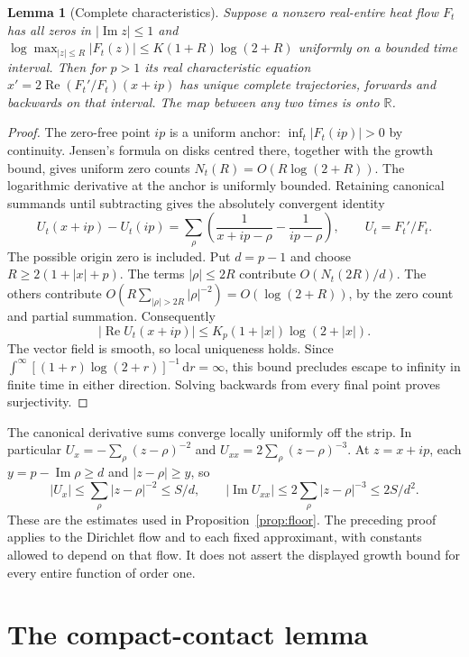 \documentclass[11pt]{article}
\newtheorem{lemma}[theorem]{Lemma}
\theoremstyle{remark}\newtheorem{remark}[theorem]{Remark}
\newcommand{\Rea}{\operatorname{Re}}
\newcommand{\Ima}{\operatorname{Im}}
\newcommand{\dd}{\mathrm{d}}
\begin{document}
\begin{lemma}[Complete characteristics]\label{lem:complete}
Suppose a nonzero real-entire heat flow $F_t$ has all zeros in
$|\Ima z|\le1$ and
$\log\max_{|z|\le R}|F_t(z)|\le K(1+R)\log(2+R)$ uniformly on a
bounded time interval. Then for $p>1$ its real characteristic equation
$x'=2\Rea(F_t'/F_t)(x+ip)$ has unique complete trajectories, forwards
and backwards on that interval. The map between any two times is onto
$\mathbb R$.
\end{lemma}
\begin{proof}
The zero-free point $ip$ is a uniform anchor:
$\inf_t|F_t(ip)|>0$ by continuity. Jensen's formula on disks centred
there, together with the growth bound, gives uniform zero counts
$N_t(R)=O(R\log(2+R))$. The logarithmic derivative at the anchor is
uniformly bounded. Retaining canonical summands until subtracting gives
the absolutely convergent identity
\[
 U_t(x+ip)-U_t(ip)=\sum_\rho
 \left(\frac1{x+ip-\rho}-\frac1{ip-\rho}\right),
 \qquad U_t=F_t'/F_t.
\]
The possible origin zero is included. Put $d=p-1$ and choose
$R\ge2(1+|x|+p)$. The terms $|\rho|\le2R$ contribute
$O(N_t(2R)/d)$. The others contribute
$O(R\sum_{|\rho|>2R}|\rho|^{-2})=O(\log(2+R))$, by the zero count
and partial summation. Consequently
\[
 |\Rea U_t(x+ip)|\le K_p(1+|x|)\log(2+|x|).
\]
The vector field is smooth, so local uniqueness holds. Since
$\int^\infty [(1+r)\log(2+r)]^{-1}\,\dd r=\infty$, this bound
precludes escape to infinity in finite time in either direction.
Solving backwards from every final point proves surjectivity.
\end{proof}

The canonical derivative sums converge locally uniformly off the strip.
In particular $U_x=-\sum_\rho(z-\rho)^{-2}$ and
$U_{xx}=2\sum_\rho(z-\rho)^{-3}$. At $z=x+ip$, each
$y=p-\Ima\rho\ge d$ and $|z-\rho|\ge y$, so
\[
 |U_x|\le\sum_\rho |z-\rho|^{-2}\le S/d,
 \qquad |\Ima U_{xx}|\le2\sum_\rho |z-\rho|^{-3}\le2S/d^2.
\]
These are the estimates used in Proposition~\ref{prop:floor}.
The preceding proof applies to the Dirichlet flow and to each fixed
approximant, with constants allowed to depend on that flow. It does not
assert the displayed growth bound for every entire function of order one.

\section{The compact-contact lemma}\label{app:compact}
\end{document}
